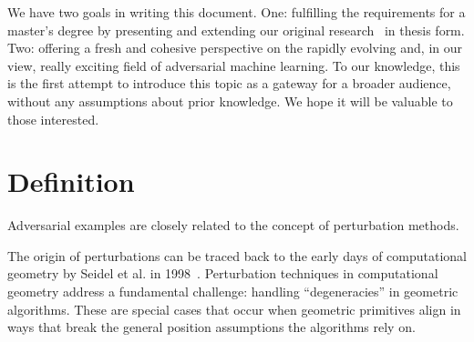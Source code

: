 \documentclass[a4paper, oneside]{discothesis}
\begin{document}
We have two goals in writing this document. One: fulfilling the requirements for a master's degree by presenting and extending our original research~\cite{jabary2024seeing} in thesis form. Two: offering a fresh and cohesive perspective on the rapidly evolving and, in our view, really exciting field of adversarial machine learning. To our knowledge, this is the first attempt to introduce this topic as a gateway for a broader audience, without any assumptions about prior knowledge. We hope it will be valuable to those interested.

\section{Definition}

Adversarial examples are closely related to the concept of perturbation methods.

The origin of perturbations can be traced back to the early days of computational geometry by Seidel et al. in 1998~\cite{seidel1998nature}. Perturbation techniques in computational geometry address a fundamental challenge: handling ``degeneracies'' in geometric algorithms. These are special cases that occur when geometric primitives align in ways that break the general position assumptions the algorithms rely on.
\end{document}
